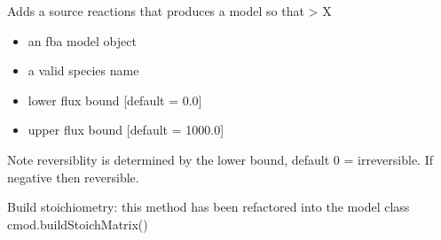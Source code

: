 \documentclass[letterpaper,10pt,english]{sphinxmanual}
\begin{document}

\begin{fulllineitems}
\label{\detokenize{modules_doc:cbmpy.CBTools.addSourceReaction}}
\pysigstartsignatures
{}
\pysigstopsignatures
\sphinxAtStartPar
Adds a source reactions that produces a model  so that \textendash{}\textgreater{} X
\begin{itemize}
\item {} 
\sphinxAtStartPar
{} an fba model object

\item {} 
\sphinxAtStartPar
{} a valid species name

\item {} 
\sphinxAtStartPar
{} lower flux bound {[}default = 0.0{]}

\item {} 
\sphinxAtStartPar
{} upper flux bound {[}default = 1000.0{]}

\end{itemize}

\sphinxAtStartPar
Note reversiblity is determined by the lower bound, default 0 = irreversible. If
negative then reversible.

\end{fulllineitems}


\begin{fulllineitems}
\label{\detokenize{modules_doc:cbmpy.CBTools.addStoichToFBAModel}}
\pysigstartsignatures
{}
\pysigstopsignatures
\sphinxAtStartPar
Build stoichiometry: this method has been refactored into the model class \sphinxhyphen{} cmod.buildStoichMatrix()

\end{fulllineitems}
\end{document}
